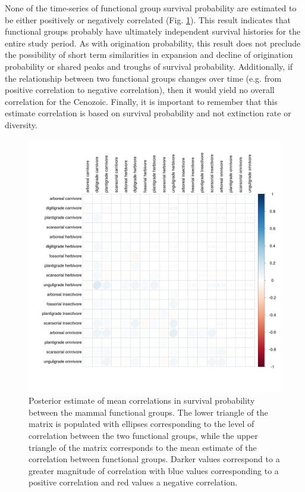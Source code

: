 \documentclass[12pt,letterpaper]{article}
\begin{document}
None of the time-series of functional group survival probability are estimated to be either positively or negatively correlated (Fig. \ref{fig:survival_corr}). This result indicates that functional groups probably have ultimately independent survival histories for the entire study period. As with origination probability, this result does not preclude the possibility of short term similarities in expansion and decline of origination probability or shared peaks and troughs of survival probability. Additionally, if the relationship between two functional groups changes over time (e.g. from positive correlation to negative correlation), then it would yield no overall correlation for the Cenozoic. Finally, it is important to remember that this estimate correlation is based on survival probability and not extinction rate or diversity.
\begin{figure}[ht]
  \centering
  \includegraphics[width=\textwidth,height=\textheight,keepaspectratio=true]{figure/survival_correlation}
  \caption{Posterior estimate of mean correlations in survival probability between the mammal functional groups. The lower triangle of the matrix is populated with ellipses corresponding to the level of correlation between the two functional groups, while the upper triangle of the matrix corresponds to the mean estimate of the correlation between functional groups. Darker values correspond to a greater magnitude of correlation with blue values corresponding to a positive correlation and red values a negative correlation.}
  \label{fig:survival_corr}
\end{figure}
\end{document}
